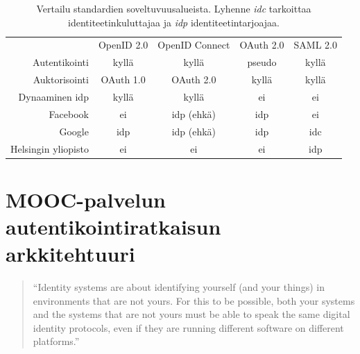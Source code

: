 \documentclass[finnish,gradu]{tktltiki}
\begin{document}
  \begin{table}
    \begin{tabular}{r|c|c|c|c|}
    \multicolumn{1}{r}{}
     & \multicolumn{1}{c}{OpenID 2.0}
     & \multicolumn{1}{c}{OpenID Connect}
     & \multicolumn{1}{c}{OAuth 2.0}
     & \multicolumn{1}{c}{SAML 2.0} \\
    \cline{2-5}
    Autentikointi  & kyllä       & kyllä       & pseudo       & kyllä \\
    \cline{1-5}
    Auktorisointi  & OAuth 1.0   & OAuth 2.0   & kyllä        & kyllä \\
    \cline{1-5}
    Dynaaminen idp & kyllä       & kyllä       & ei           & ei \\
    \cline{1-5}
    Facebook       & ei          & idp (ehkä)  & idp          & ei \\
    \cline{1-5}
    Google         & idp         & idp (ehkä)  & idp          & idc \\
    \cline{1-5}
    Helsingin yliopisto & ei          & ei          & ei           & idp \\
    \cline{2-5}
    \end{tabular}

    \label{tab:sso_soveltuvuudet}
    \caption{Vertailu standardien soveltuvuusalueista. Lyhenne \emph{idc} tarkoittaa identiteetinkuluttajaa ja \emph{idp} identiteetintarjoajaa.}

  \end{table}







\newpage
\section{MOOC-palvelun autentikointiratkaisun arkkitehtuuri} %
\label{sec:mooc_palvelun_autentikointiratkaisun_arkkitehtuuri}

  \begin{quote}
    ``Identity systems are about identifying yourself (and your things) in environments that are not yours.
    For this to be possible, both your systems and the systems that are not yours
    must be able to speak the same digital identity protocols,
    even if they are running different software on different platforms.''~\cite{cameron_id_arch_2006}
  \end{quote}
\end{document}
